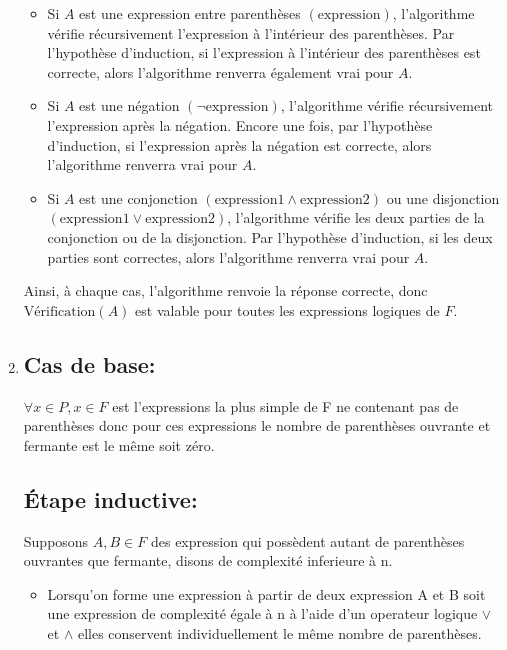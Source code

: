 \documentclass[16pt]{report}
\begin{document}
\begin{multicols*}{2}
\begin{enumerate}
            \begin{itemize}
                \item Si \(A\) est une expression entre parenthèses \((\text{expression})\), l'algorithme vérifie récursivement l'expression à l'intérieur des parenthèses. Par l'hypothèse d'induction, si l'expression à l'intérieur des parenthèses est correcte, alors l'algorithme renverra également vrai pour \(A\).
                \item Si \(A\) est une négation \((\lnot\text{expression})\), l'algorithme vérifie récursivement l'expression après la négation. Encore une fois, par l'hypothèse d'induction, si l'expression après la négation est correcte, alors l'algorithme renverra vrai pour \(A\).
                \item Si \(A\) est une conjonction \((\text{expression1}\land\text{expression2})\) ou une disjonction \((\text{expression1}\lor\text{expression2})\), l'algorithme vérifie les deux parties de la conjonction ou de la disjonction. Par l'hypothèse d'induction, si les deux parties sont correctes, alors l'algorithme renverra vrai pour \(A\).
            \end{itemize}

            Ainsi, à chaque cas, l'algorithme renvoie la réponse correcte, donc \(\text{Vérification}(A)\) est valable pour toutes les expressions logiques de \(F\).

            \item
        \subsection*{Cas de base:}

        $\forall x \in P, x \in F$ est l'expressions la plus simple de F ne contenant pas de parenthèses donc pour ces expressions le nombre de parenthèses ouvrante et fermante est le même soit zéro.

        \subsection*{Étape inductive:}

        Supposons $A, B \in  F$ des expression qui possèdent autant de parenthèses ouvrantes que fermante, disons de complexité inferieure à n. \\
        \begin{itemize}

        \item Lorsqu'on forme une expression à partir de deux expression A et B soit une expression de complexité égale à n à l'aide d'un operateur logique $\lor$ et $\land$ elles conservent individuellement le même nombre de parenthèses. \\ 


\end{itemize}
\end{enumerate}
\end{multicols*}
\end{document}
